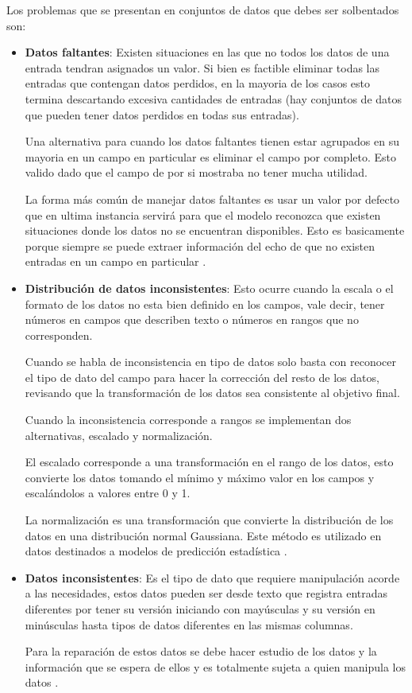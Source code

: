 \documentclass[letter,12pt]{report}
\begin{document}
Los problemas que se presentan en conjuntos de datos que debes ser solbentados son:
\begin{itemize}
    \item \textbf{Datos faltantes}: Existen situaciones en las que no todos los datos de una
        entrada tendran asignados un valor. Si bien es factible eliminar todas las
        entradas que contengan datos perdidos, en la mayoria de los casos esto termina
        descartando excesiva cantidades de entradas (hay conjuntos de datos que pueden
        tener datos perdidos en todas sus entradas).

        Una alternativa para cuando los datos faltantes tienen estar agrupados en su
        mayoria en un campo en particular es eliminar el campo por completo. Esto valido
        dado que el campo de por si mostraba no tener mucha utilidad.

        La forma más común de manejar datos faltantes es usar un valor por defecto que en
        ultima instancia servirá para que el modelo reconozca que existen situaciones
        donde los datos no se encuentran disponibles. Esto es basicamente porque siempre
        se puede extraer información del echo de que no existen entradas en un campo en
        particular \cite{Miss}.
    \item \textbf{Distribución de datos inconsistentes}: Esto ocurre cuando la escala o
        el formato de los datos no esta bien definido en los campos, vale decir, tener
        números en campos que describen texto o números en rangos que no corresponden.

        Cuando se habla de inconsistencia en tipo de datos solo basta con reconocer el
        tipo de dato del campo para hacer la corrección del resto de los datos, revisando
        que la transformación de los datos sea consistente al objetivo final.

        Cuando la inconsistencia corresponde a rangos se implementan dos alternativas,
        escalado y normalización.

        El escalado corresponde a una transformación en el rango de los datos, esto
        convierte los datos tomando el mínimo y máximo valor en los campos y escalándolos
        a valores entre 0 y 1.

        La normalización es una transformación que convierte la distribución de los datos
        en una distribución normal Gaussiana. Este método es utilizado en datos
        destinados a modelos de predicción estadística \cite{Scal}.
    \item \textbf{Datos inconsistentes}: Es el tipo de dato que requiere manipulación
        acorde a las necesidades, estos datos pueden ser desde texto que registra
        entradas diferentes por tener su versión iniciando con mayúsculas y su versión en
        minúsculas hasta tipos de datos diferentes en las mismas columnas.

        Para la reparación de estos datos se debe hacer estudio de los datos y la
        información que se espera de ellos y es totalmente sujeta a quien manipula los
        datos \cite{Ingsoc}.
\end{itemize}
\end{document}
